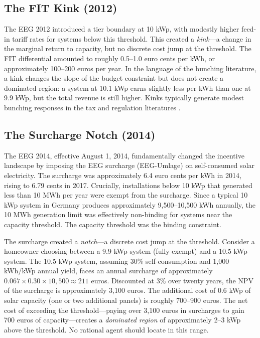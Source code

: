 \documentclass[12pt]{article}
\begin{document}
\subsection{The FIT Kink (2012)}

The EEG 2012 introduced a tier boundary at 10 kWp, with modestly higher feed-in tariff rates for systems below this threshold. This created a \textit{kink}---a change in the marginal return to capacity, but no discrete cost jump at the threshold. The FIT differential amounted to roughly 0.5--1.0 euro cents per kWh, or approximately 100--200 euros per year. In the language of the bunching literature, a kink changes the slope of the budget constraint but does not create a dominated region: a system at 10.1 kWp earns slightly less per kWh than one at 9.9 kWp, but the total revenue is still higher. Kinks typically generate modest bunching responses in the tax and regulation literatures \citep{saez2010taxpayers, kleven2016bunching}.

\subsection{The Surcharge Notch (2014)}

The EEG 2014, effective August 1, 2014, fundamentally changed the incentive landscape by imposing the EEG surcharge (EEG-Umlage) on self-consumed solar electricity. The surcharge was approximately 6.4 euro cents per kWh in 2014, rising to 6.79 cents in 2017. Crucially, installations below 10 kWp that generated less than 10 MWh per year were exempt from the surcharge. Since a typical 10 kWp system in Germany produces approximately 9,500--10,500 kWh annually, the 10 MWh generation limit was effectively non-binding for systems near the capacity threshold. The capacity threshold was the binding constraint.

The surcharge created a \textit{notch}---a discrete cost jump at the threshold. Consider a homeowner choosing between a 9.9 kWp system (fully exempt) and a 10.5 kWp system. The 10.5 kWp system, assuming 30\% self-consumption and 1,000 kWh/kWp annual yield, faces an annual surcharge of approximately $0.067 \times 0.30 \times 10{,}500 \approx 211$ euros. Discounted at 3\% over twenty years, the NPV of the surcharge is approximately 3,100 euros. The additional cost of 0.6 kWp of solar capacity (one or two additional panels) is roughly 700--900 euros. The net cost of exceeding the threshold---paying over 3,100 euros in surcharges to gain 700 euros of capacity---creates a \textit{dominated region} of approximately 2--3 kWp above the threshold. No rational agent should locate in this range.
\end{document}
